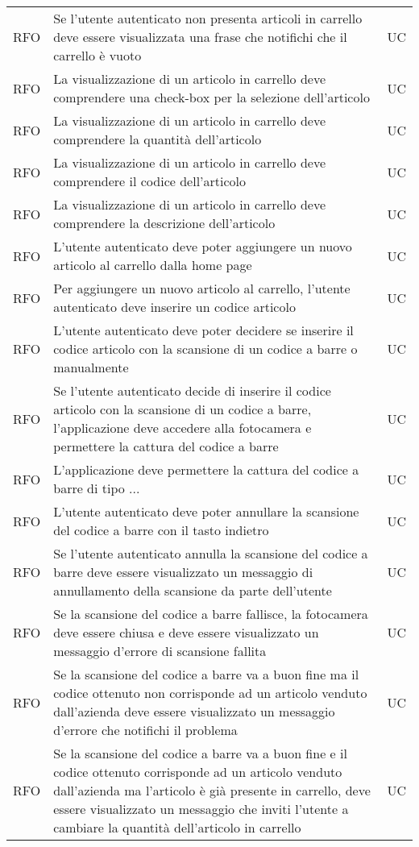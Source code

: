 \begin{table}
\begin{tabularx}{\textwidth}{lXl}
RFO & Se l'utente autenticato non presenta articoli in carrello deve essere visualizzata una frase che notifichi che il carrello è vuoto & UC \\
RFO & La visualizzazione di un articolo in carrello deve comprendere una check-box per la selezione dell'articolo & UC \\
RFO & La visualizzazione di un articolo in carrello deve comprendere la quantità dell'articolo & UC \\
RFO & La visualizzazione di un articolo in carrello deve comprendere il codice dell'articolo & UC \\
RFO & La visualizzazione di un articolo in carrello deve comprendere la descrizione dell'articolo & UC \\
RFO & L'utente autenticato deve poter aggiungere un nuovo articolo al carrello dalla home page & UC \\
RFO & Per aggiungere un nuovo articolo al carrello, l'utente autenticato deve inserire un codice articolo & UC \\
RFO & L'utente autenticato deve poter decidere se inserire il codice articolo con la scansione di un codice a barre o manualmente & UC \\
RFO & Se l'utente autenticato decide di inserire il codice articolo con la scansione di un codice a barre, l'applicazione deve accedere alla fotocamera e permettere la cattura del codice a barre & UC \\
RFO & L'applicazione deve permettere la cattura del codice a barre di tipo ... & UC \\
RFO & L'utente autenticato deve poter annullare la scansione del codice a barre con il tasto indietro & UC \\
RFO & Se l'utente autenticato annulla la scansione del codice a barre deve essere visualizzato un messaggio di annullamento della scansione da parte dell'utente & UC \\
RFO & Se la scansione del codice a barre fallisce, la fotocamera deve essere chiusa e deve essere visualizzato un messaggio d'errore di scansione fallita & UC \\
RFO & Se la scansione del codice a barre va a buon fine ma il codice ottenuto non corrisponde ad un articolo venduto dall'azienda deve essere visualizzato un messaggio d'errore che notifichi il problema & UC \\
RFO & Se la scansione del codice a barre va a buon fine e il codice ottenuto corrisponde ad un articolo venduto dall'azienda ma l'articolo è già presente in carrello, deve essere visualizzato un messaggio che inviti l'utente a cambiare la quantità dell'articolo in carrello & UC \\

\end{tabularx}
\end{table}
